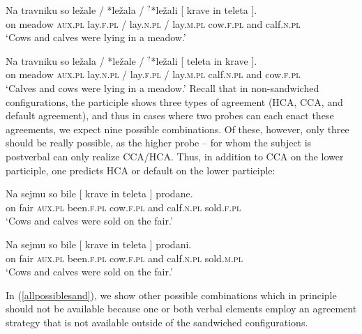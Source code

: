 \documentclass[output=paper
,modfonts
,nonflat]{langsci/langscibook}
\begin{document}
\ea \label{postverbal}
\gll Na travniku so ležale / *ležala  / $^?$*ležali [ krave in teleta ].\\
on meadow \textsc{aux.pl}  lay.\textsc{f.pl} /  lay.\textsc{n.pl} /  lay.\textsc{m.pl} {} cow.\textsc{f.pl} and calf.\textsc{n.pl} {} \\
\glt `Cows and calves were lying in a meadow.'
\z


\ea \gll Na travniku so ležala / *ležale / $^?$*ležali [ teleta in krave ].\\
on meadow \textsc{aux.pl}  lay.\textsc{n.pl} /  lay.\textsc{f.pl} /  lay.\textsc{m.pl} {} calf.\textsc{n.pl} and cow.\textsc{f.pl} {} \\
\glt `Calves and cows were lying in a meadow.'
\z
Recall that in non-sandwiched configurations, the participle shows three types of agreement (HCA, CCA, and default agreement), and thus in cases where two probes can each enact these agreements, we expect nine possible combinations. Of these, however, only three should be really possible, as the higher probe -- for whom the subject is postverbal can only realize CCA/HCA. Thus, in addition to CCA on the lower participle, one predicts HCA or default on the lower participle:

\begin{exe}
\ex
\begin{xlist}
\ex \label{allhcahca}\gll Na sejmu so bile [ krave in teleta ] prodane.\\
on fair \textsc{aux.pl} been.\textsc{f.pl} {} cow.\textsc{f.pl} and calf.\textsc{n.pl} {} sold.\textsc{f.pl}\\
\glt `Cows and calves were sold on the fair.'

\ex \label{allhcadef}\gll Na sejmu so bile [ krave in teleta ] prodani.\\
on fair \textsc{aux.pl} been.\textsc{f.pl} {} cow.\textsc{f.pl} and calf.\textsc{n.pl} {} sold.\textsc{m.pl} \\
\glt `Cows and calves were sold on the fair.'
\end{xlist}
\end{exe}
In (\ref{allpossiblesand}), we show other possible combinations which in principle should not be available because one or both verbal elements employ an agreement strategy that is not available outside of the sandwiched configurations. 
\end{document}

